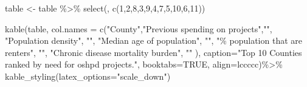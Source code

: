 \documentclass[
]{article}
\newenvironment{Shaded}{\begin{snugshade}}{\end{snugshade}}
\newcommand{\AttributeTok}[1]{\textcolor[rgb]{0.77,0.63,0.00}{#1}}
\newcommand{\ConstantTok}[1]{\textcolor[rgb]{0.00,0.00,0.00}{#1}}
\newcommand{\DecValTok}[1]{\textcolor[rgb]{0.00,0.00,0.81}{#1}}
\newcommand{\FunctionTok}[1]{\textcolor[rgb]{0.00,0.00,0.00}{#1}}
\newcommand{\NormalTok}[1]{#1}
\newcommand{\OtherTok}[1]{\textcolor[rgb]{0.56,0.35,0.01}{#1}}
\newcommand{\SpecialCharTok}[1]{\textcolor[rgb]{0.00,0.00,0.00}{#1}}
\newcommand{\StringTok}[1]{\textcolor[rgb]{0.31,0.60,0.02}{#1}}
\begin{document}
\begin{Shaded}
\begin{Highlighting}[]
\NormalTok{table }\OtherTok{\textless{}{-}}\NormalTok{ table }\SpecialCharTok{\%\textgreater{}\%} \FunctionTok{select}\NormalTok{(, }\FunctionTok{c}\NormalTok{(}\DecValTok{1}\NormalTok{,}\DecValTok{2}\NormalTok{,}\DecValTok{8}\NormalTok{,}\DecValTok{3}\NormalTok{,}\DecValTok{9}\NormalTok{,}\DecValTok{4}\NormalTok{,}\DecValTok{7}\NormalTok{,}\DecValTok{5}\NormalTok{,}\DecValTok{10}\NormalTok{,}\DecValTok{6}\NormalTok{,}\DecValTok{11}\NormalTok{))}

\FunctionTok{kable}\NormalTok{(table,}
        \AttributeTok{col.names =} \FunctionTok{c}\NormalTok{(}\StringTok{"County"}\NormalTok{,}\StringTok{"Previous spending on projects"}\NormalTok{,}\StringTok{""}\NormalTok{,}
                      \StringTok{"Population density"}\NormalTok{, }\StringTok{""}\NormalTok{,}
                      \StringTok{"Median age of population"}\NormalTok{, }\StringTok{""}\NormalTok{,}
                       \StringTok{"\% population that are renters"}\NormalTok{, }\StringTok{""}\NormalTok{,}
                      \StringTok{"Chronic disease mortality burden"}\NormalTok{, }\StringTok{""}
\NormalTok{                    ),}
       \AttributeTok{caption=}\StringTok{"Top 10 Counties ranked by need for oshpd projects."}\NormalTok{,}
        \AttributeTok{booktabs=}\ConstantTok{TRUE}\NormalTok{,}
        \AttributeTok{align=}\StringTok{\textquotesingle{}lccccc\textquotesingle{}}\NormalTok{)}\SpecialCharTok{\%\textgreater{}\%}
   \FunctionTok{kable\_styling}\NormalTok{(}\AttributeTok{latex\_options=}\StringTok{"scale\_down"}\NormalTok{)}
\end{Highlighting}
\end{Shaded}
\end{document}
